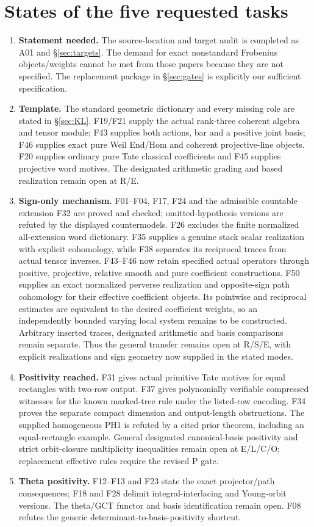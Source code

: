 \section{States of the five requested tasks}
\begin{enumerate}
\item \textbf{Statement needed.} The source-location and target audit is completed as A01 and \S\ref{sec:targets}. The demand for exact nonstandard Frobenius objects/weights cannot be met from those papers because they are not specified. The replacement package in \S\ref{sec:gates} is explicitly our sufficient specification.
\item \textbf{Template.} The standard geometric dictionary and every missing role are stated in \S\ref{sec:KL}. F19/F21 supply the actual rank-three coherent algebra and tensor module; F43 supplies both actions, bar and a positive joint basis; F46 supplies exact pure Weil End/Hom and coherent projective-line objects. F20 supplies ordinary pure Tate classical coefficients and F45 supplies projective word motives. The designated arithmetic grading and based realization remain open at R/E.
\item \textbf{Sign-only mechanism.} F01--F04, F17, F24 and the admissible countable extension F32 are proved and checked; omitted-hypothesis versions are refuted by the displayed countermodels. F26 excludes the finite normalized all-extension word dictionary. F35 supplies a genuine stack scalar realization with explicit cohomology, while F38 separates its reciprocal traces from actual tensor inverses. F43--F46 now retain specified actual operators through positive, projective, relative smooth and pure coefficient constructions. F50 supplies an exact normalized perverse realization and opposite-sign path cohomology for their effective coefficient objects. Its pointwise and reciprocal estimates are equivalent to the desired coefficient weights, so an independently bounded varying local system remains to be constructed. Arbitrary inserted traces, designated arithmetic and basis comparisons remain separate. Thus the general transfer remains open at R/S/E, with explicit realizations and sign geometry now supplied in the stated modes.
\item \textbf{Positivity reached.} F31 gives actual primitive Tate motives for equal rectangles with two-row output. F37 gives polynomially verifiable compressed witnesses for the known marked-tree rule under the listed-row encoding. F34 proves the separate compact dimension and output-length obstructions. The supplied homogeneous PH1 is refuted by a cited prior theorem, including an equal-rectangle example. General designated canonical-basis positivity and strict orbit-closure multiplicity inequalities remain open at E/L/C/O; replacement effective rules require the revised P gate.
\item \textbf{Theta positivity.} F12--F13 and F23 state the exact projector/path consequences; F18 and F28 delimit integral-interlacing and Young-orbit versions. The theta/GCT functor and basis identification remain open. F08 refutes the generic determinant-to-basis-positivity shortcut.
\end{enumerate}

